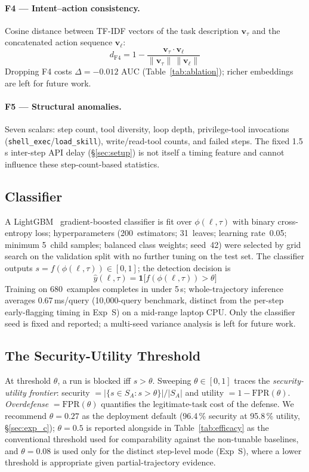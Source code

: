 \documentclass[conference]{IEEEtran}
\begin{document}
\paragraph{F4 --- Intent--action consistency.}
Cosine distance between TF-IDF vectors of the task description
$\mathbf{v}_\tau$ and the concatenated action sequence $\mathbf{v}_\ell$:
\[d_{\mathrm{F4}} = 1 - \frac{\mathbf{v}_\tau\cdot\mathbf{v}_\ell}{\|\mathbf{v}_\tau\|\,\|\mathbf{v}_\ell\|}\]
Dropping F4 costs $\Delta{=}{-}0.012$ AUC (Table~\ref{tab:ablation});
richer embeddings are left for future work.

\paragraph{F5 --- Structural anomalies.}
Seven scalars: step count, tool diversity, loop depth,
privilege-tool invocations (\texttt{shell\_exec}/\texttt{load\_skill}),
write/read-tool counts, and failed steps. The fixed 1.5\,s inter-step
API delay (\S\ref{sec:setup}) is not itself a timing feature and
cannot influence these step-count-based statistics.

\subsection{Classifier}

A LightGBM~\cite{ke2017lightgbm} gradient-boosted classifier is fit
over $\phi(\ell,\tau)$ with binary cross-entropy loss; hyperparameters
(200~estimators; 31~leaves; learning rate~0.05; minimum 5~child
samples; balanced class weights; seed~42) were selected by grid
search on the validation split with no further tuning on the test set.
The classifier outputs $s{=}f(\phi(\ell,\tau))\in[0,1]$; the detection
decision is
\[\hat{y}(\ell,\tau)=\mathbf{1}\bigl[f(\phi(\ell,\tau))>\theta\bigr]\]
Training on 680~examples completes in under 5\,s; whole-trajectory
inference averages 0.67\,ms/query (10{,}000-query benchmark, distinct
from the per-step early-flagging timing in Exp~S) on a mid-range
laptop CPU. Only the classifier seed is fixed and reported; a
multi-seed variance analysis is left for future work.

\subsection{The Security-Utility Threshold}
\label{sec:threshold}

At threshold $\theta$, a run is blocked iff $s > \theta$.  Sweeping
$\theta \in [0,1]$ traces the \emph{security-utility frontier}: security
$= |\{s \!\in\! S_A : s > \theta\}|/|S_A|$ and utility
$= 1 - \mathrm{FPR}(\theta)$.  \emph{Overdefense}
$= \mathrm{FPR}(\theta)$ quantifies the legitimate-task cost of the
defense. We recommend $\theta{=}0.27$ as the deployment default
(96.4\,\% security at 95.8\,\% utility, \S\ref{sec:exp_c});
$\theta{=}0.5$ is reported alongside in Table~\ref{tab:efficacy} as
the conventional threshold used for comparability against the
non-tunable baselines, and $\theta{=}0.08$ is used only for the
distinct step-level mode (Exp~S), where a lower threshold is
appropriate given partial-trajectory evidence.
\end{document}
